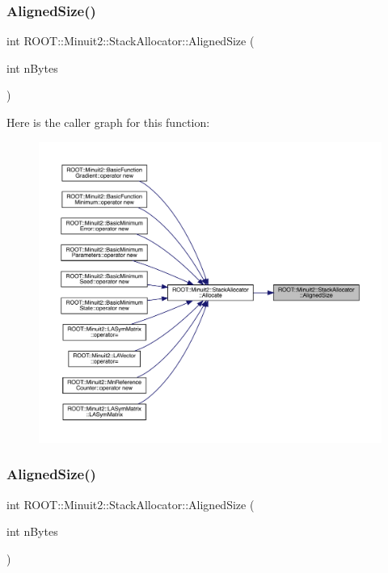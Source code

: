 \subsubsection{\texorpdfstring{AlignedSize()}{AlignedSize()}\hspace{0.1cm}{\footnotesize\ttfamily [1/3]}}
{\footnotesize\ttfamily int R\+O\+O\+T\+::\+Minuit2\+::\+Stack\+Allocator\+::\+Aligned\+Size (\begin{DoxyParamCaption}\item[{int}]{n\+Bytes }\end{DoxyParamCaption})\hspace{0.3cm}{\ttfamily [inline]}}

Here is the caller graph for this function\+:
\nopagebreak
\begin{figure}[H]
\begin{center}
\leavevmode
\includegraphics[width=350pt]{d3/d1e/classROOT_1_1Minuit2_1_1StackAllocator_ab40fb208cf8d4c0b3edf51137672c3d1_icgraph}
\end{center}
\end{figure}
\mbox{\label{classROOT_1_1Minuit2_1_1StackAllocator_ab40fb208cf8d4c0b3edf51137672c3d1}} 
\subsubsection{\texorpdfstring{AlignedSize()}{AlignedSize()}\hspace{0.1cm}{\footnotesize\ttfamily [2/3]}}
{\footnotesize\ttfamily int R\+O\+O\+T\+::\+Minuit2\+::\+Stack\+Allocator\+::\+Aligned\+Size (\begin{DoxyParamCaption}\item[{int}]{n\+Bytes }\end{DoxyParamCaption})\hspace{0.3cm}{\ttfamily [inline]}}

